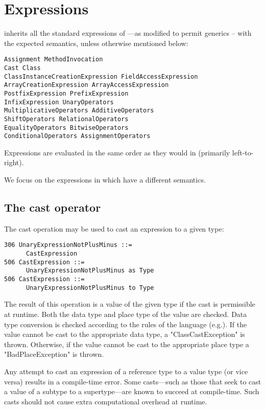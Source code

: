\section{Expressions}\label{XtenExpressions}

{}\Xten{} inherits all the standard expressions of \Java{}
\cite[\S~15]{jls2}---as modified to permit generics \cite{gjspec} --
with the expected semantics, unless otherwise mentioned below:

\begin{verbatim}
Assignment MethodInvocation 
Cast Class
ClassInstanceCreationExpression FieldAccessExpression   
ArrayCreationExpression ArrayAccessExpression
PostfixExpression PrefixExpression 
InfixExpression UnaryOperators
MultiplicativeOperators AdditiveOperators 
ShiftOperators RelationalOperators  
EqualityOperators BitwiseOperators
ConditionalOperators AssignmentOperators
\end{verbatim}

Expressions are evaluated in the same order as they would in \java{}
(primarily
left-to-right).\label{FieldAccess}\label{ClassCreation}\label{MethodInvocation}

We focus on the expressions in \Xten{} which have a different
semantics.

\subsection{The cast operator}\label{ClassCast}

The cast operation may be used to cast an expression to a given type:
\begin{verbatim}
306 UnaryExpressionNotPlusMinus ::= 
      CastExpression
506 CastExpression ::= 
      UnaryExpressionNotPlusMinus as Type
506 CastExpression ::= 
      UnaryExpressionNotPlusMinus to Type
\end{verbatim}

The result of this operation is a value of the given type if the cast
is permissible at runtime. Both the data type and place type of the
value are checked. Data type conversion is checked according to the
rules of the \java{} language (e.g.{}\cite[\S 5.5]{jls2}). If the
value cannot be cast to the appropriate data type, a
\xcd"ClassCastException"
is thrown. Otherwise, if the value cannot be cast to the
appropriate place type a \xcd"BadPlaceException" is thrown. 

Any attempt to cast an expression of a reference type to a value type
(or vice versa) results in a compile-time error. Some casts---such as
those that seek to cast a value of a subtype to a supertype---are
known to succeed at compile-time. Such casts should not cause extra
computational overhead at runtime.

